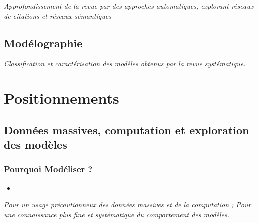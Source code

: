 


\textit{Approfondissement de la revue par des approches automatiques, explorant réseaux de citations et réseaux sémantiques}



\subsection{Modélographie}

\textit{Classification et caractérisation des modèles obtenus par la revue systématique.}




\section{Positionnements}



\subsection{Données massives, computation et exploration des modèles}


\subsubsection{Pourquoi Modéliser ?}

\begin{itemize}
	\item 
\end{itemize}

\textit{Pour un usage précautionneux des données massives et de la computation ; Pour une connaissance plus fine et systématique du comportement des modèles.}



